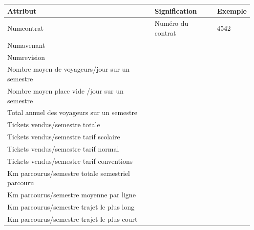 \documentclass[a4paper]{report}
\begin{document}
\begin{doublespace}
	\begin{table}[H]
		\begin{center}
			\begin{tabularx}{17.5cm}{|X|p{3cm}|p{1.5cm}|}
				\hline
				\textbf{Attribut}                                                 & \textbf{Signification} & \textbf{Exemple} \\
				\hline
				Numcontrat                                                        & Numéro du contrat      & 4542             \\
				\hline
				Numavenant                                                        &                        &                  \\
				\hline
				Numrevision                                                       &                        &                  \\
				\hline
				Nombre moyen de voyageurs/jour  sur un semestre                   &                        &                  \\
				\hline
				Nombre moyen place vide /jour  sur un semestre                    &                        &                  \\
				\hline
				Total annuel des voyageurs  sur un semestre                       &                        &                  \\
				\hline
				Tickets vendus/semestre totale                                    &                        &                  \\
				\hline
				Tickets vendus/semestre tarif scolaire                            &                        &                  \\
				\hline
				Tickets vendus/semestre tarif normal                              &                        &                  \\
				\hline
				Tickets vendus/semestre tarif conventions                         &                        &                  \\
				\hline
				Km parcourus/semestre totale semestriel parcouru                  &                        &                  \\
				\hline
				Km parcourus/semestre moyenne par ligne                           &                        &                  \\
				\hline
				Km parcourus/semestre trajet le plus long                         &                        &                  \\
				\hline
				Km parcourus/semestre trajet le plus court                        &                        &                  \\

\end{tabularx}
\end{center}
\end{table}
\end{doublespace}
\end{document}
